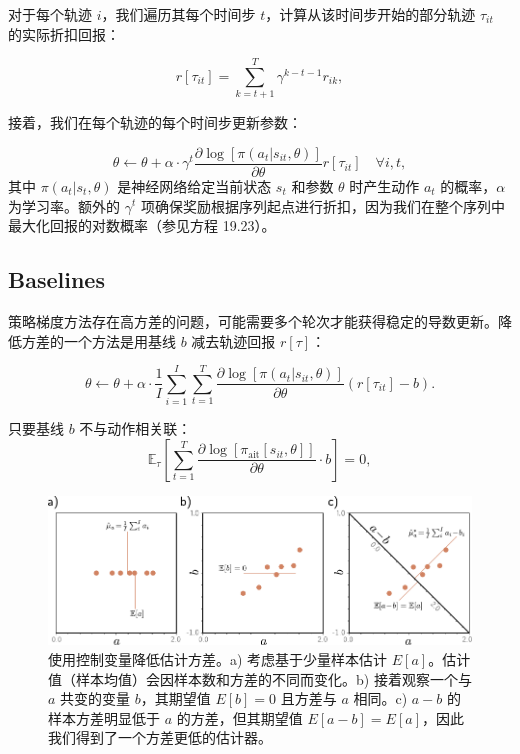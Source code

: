 \documentclass[lang=cn,newtx,10pt,scheme=chinese]{elegantbook}
\begin{document}
对于每个轨迹 \(i\)，我们遍历其每个时间步 \(t\)，计算从该时间步开始的部分轨迹 \(\tau_{it}\) 的实际折扣回报：

\begin{equation}
r[\tau_{it}] = \sum_{k=t+1}^{T} \gamma^{k-t-1} r_{ik}, 
\end{equation}

接着，我们在每个轨迹的每个时间步更新参数：

\begin{equation}
\theta \leftarrow \theta + \alpha \cdot \gamma^{t} \frac{\partial \log [\pi(a_t|s_{it}, \theta)]}{\partial \theta} r[\tau_{it}] \quad \forall i, t, 
\end{equation}
其中 \(\pi(a_t|s_t, \theta)\) 是神经网络给定当前状态 \(s_t\) 和参数 \(\theta\) 时产生动作 \(a_t\) 的概率，\(\alpha\) 为学习率。额外的 \(\gamma^{t}\) 项确保奖励根据序列起点进行折扣，因为我们在整个序列中最大化回报的对数概率（参见方程 19.23）。

\subsection{Baselines}
策略梯度方法存在高方差的问题，可能需要多个轮次才能获得稳定的导数更新。降低方差的一个方法是用基线 \(b\) 减去轨迹回报 \(r[\tau]\)：

\begin{equation}
\theta \leftarrow \theta + \alpha \cdot \frac{1}{I} \sum_{i=1}^{I} \sum_{t=1}^{T} \frac{\partial \log [\pi(a_t|s_{it}, \theta)]}{\partial \theta} (r[\tau_{it}] - b). 
\end{equation}

只要基线 \(b\) 不与动作相关联：
\begin{equation}
\mathbb{E}_{\tau}\left[ \sum_{t=1}^T \frac{\partial \log[\pi_{\text{ait}}[s_{it}, \theta]]}{\partial \theta} \cdot b \right] = 0, 
\end{equation}

\begin{figure}[ht!]
\centering
\includegraphics[width=0.7\linewidth]{PDFFigures/UDLChap19PDF/ReinforcementVariance.pdf}
\caption{使用控制变量降低估计方差。a) 考虑基于少量样本估计 \(E[a]\)。估计值（样本均值）会因样本数和方差的不同而变化。b) 接着观察一个与 \(a\) 共变的变量 \(b\)，其期望值 \(E[b] = 0\) 且方差与 \(a\) 相同。c) \(a - b\) 的样本方差明显低于 \(a\) 的方差，但其期望值 \(E[a - b] = E[a]\)，因此我们得到了一个方差更低的估计器。}
\end{figure}
\end{document}
